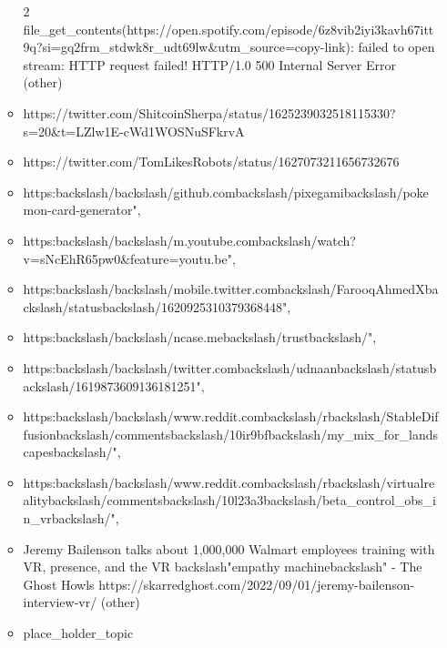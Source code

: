 \begin{itemize}
\begin{itemize}
    2
    file\_get\_contents(https://open.spotify.com/episode/6z8vib2iyi3kavh67itt9q?si=gq2frm\_stdwk8r\_udt69lw\&utm\_source=copy-link):
    failed to open stream: HTTP request failed! HTTP/1.0 500 Internal
    Server Error (other)
  \item
    https://twitter.com/ShitcoinSherpa/status/1625239032518115330?s=20\&t=LZlw1E-cWd1WOSNuSFkrvA
  \item
    https://twitter.com/TomLikesRobots/status/1627073211656732676
  \item
    https:backslash/backslash/github.combackslash/pixegamibackslash/pokemon-card-generator",
  \item
    https:backslash/backslash/m.youtube.combackslash/watch?v=sNcEhR65pw0\&feature=youtu.be",
  \item
    https:backslash/backslash/mobile.twitter.combackslash/FarooqAhmedXbackslash/statusbackslash/1620925310379368448",
  \item
    https:backslash/backslash/ncase.mebackslash/trustbackslash/",
  \item
    https:backslash/backslash/twitter.combackslash/udnaanbackslash/statusbackslash/1619873609136181251",
  \item
    https:backslash/backslash/www.reddit.combackslash/rbackslash/StableDiffusionbackslash/commentsbackslash/10ir9bfbackslash/my\_mix\_for\_landscapesbackslash/",
  \item
    https:backslash/backslash/www.reddit.combackslash/rbackslash/virtualrealitybackslash/commentsbackslash/10l23a3backslash/beta\_control\_obs\_in\_vrbackslash/",
  \item
    Jeremy Bailenson talks about 1,000,000 Walmart employees training
    with VR, presence, and the VR backslash"empathy
    machinebackslash" - The Ghost Howls
    https://skarredghost.com/2022/09/01/jeremy-bailenson-interview-vr/
    (other)
  \item
    place\_holder\_topic

    \begin{itemize}
     

\end{itemize}
\end{itemize}
\end{itemize}
